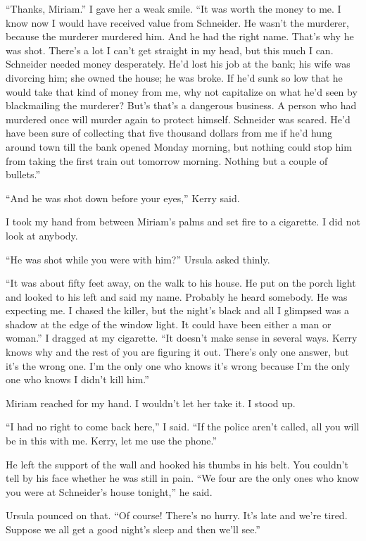 \documentclass{novel}
\begin{document}
“Thanks, Miriam.” I gave her a weak smile. “It was worth the money to me. I know now I would have received value from Schneider. He wasn’t the murderer, because the murderer murdered him. And he had the right name. That’s why he was shot. There’s a lot I can’t get straight in my head, but this much I can. Schneider needed money desperately. He’d lost his job at the bank; his wife was divorcing him; she owned the house; he was broke. If he’d sunk so low that he would take that kind of money from me, why not capitalize on what he’d seen by blackmailing the murderer? But’s that’s a dangerous business. A person who had murdered once will murder again to protect himself. Schneider was scared. He’d have been sure of collecting that five thousand dollars from me if he’d hung around town till the bank opened Monday morning, but nothing could stop him from taking the first train out tomorrow morning. Nothing but a couple of bullets.”

“And he was shot down before your eyes,” Kerry said.

I took my hand from between Miriam’s palms and set fire to a cigarette. I did not look at anybody.

“He was shot while you were with him?” Ursula asked thinly.

“It was about fifty feet away, on the walk to his house. He put on the porch light and looked to his left and said my name. Probably he heard somebody. He was expecting me. I chased the killer, but the night’s black and all I glimpsed was a shadow at the edge of the window light. It could have been either a man or woman.” I dragged at my cigarette. “It doesn’t make sense in several ways. Kerry knows why and the rest of you are figuring it out. There’s only one answer, but it’s the wrong one. I’m the only one who knows it’s wrong because I’m the only one who knows I didn’t kill him.”

Miriam reached for my hand. I wouldn’t let her take it. I stood up.

“I had no right to come back here,” I said. “If the police aren’t called, all you will be in this with me. Kerry, let me use the phone.”

He left the support of the wall and hooked his thumbs in his belt. You couldn’t tell by his face whether he was still in pain. “We four are the only ones who know you were at Schneider’s house tonight,” he said.

Ursula pounced on that. “Of course! There’s no hurry. It’s late and we’re tired. Suppose we all get a good night’s sleep and then we’ll see.”
\end{document}
